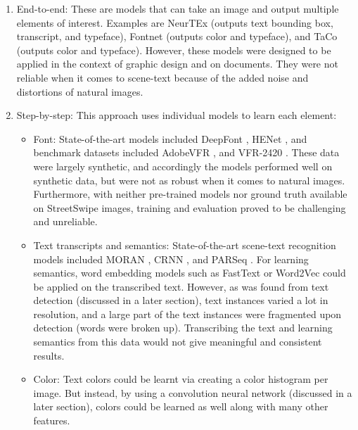 \begin{enumerate}
    \item End-to-end: These are models that can take an image and output multiple elements of interest. Examples are NeurTEx \cite{aggarwal_neurtex_2022} (outputs text bounding box, transcript, and typeface), Fontnet \cite{s_fontnet_2021} (outputs color and typeface), and TaCo \cite{nie_taco_2022} (outputs color and typeface). However, these models were designed to be applied in the context of graphic design and on documents. They were not reliable when it comes to scene-text because of the added noise and distortions of natural images.
    \item Step-by-step: This approach uses individual models to learn each element:
    \begin{itemize}
        \item Font: State-of-the-art models included DeepFont \cite{wang_deepfont_2015}, HENet \cite{chen_henet_2021}, and benchmark datasets included AdobeVFR \cite{wang_deepfont_2015}, and VFR-2420 \cite{chen_large-scale_2014}. These data were largely synthetic, and accordingly the models performed well on synthetic data, but were not as robust when it comes to natural images. Furthermore, with neither pre-trained models nor ground truth available on StreetSwipe images, training and evaluation proved to be challenging and unreliable.
        \item Text transcripts and semantics: State-of-the-art scene-text recognition models included MORAN \cite{luo_multi-object_2019}, CRNN \cite{shi_end2end_2015}, and PARSeq \cite{bautista_scene_2022}. For learning semantics, word embedding models such as FastText \cite{bojanowski_enriching_2017} or Word2Vec \cite{mikolov_efficient_2013} could be applied on the transcribed text. However, as was found from text detection (discussed in a later section), text instances varied a lot in resolution, and a large part of the text instances were fragmented upon detection (words were broken up). Transcribing the text and learning semantics from this data would not give meaningful and consistent results.
        \item Color: Text colors could be learnt via creating a color histogram \cite{srivastava_review_2015} per image. But instead, by using a convolution neural network (discussed in a later section), colors could be learned as well along with many other features.
    \end{itemize}
\end{enumerate}

